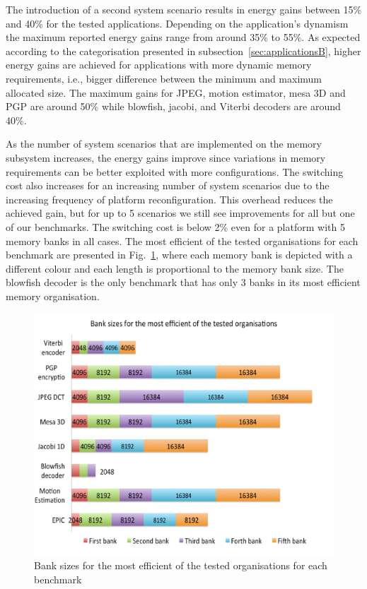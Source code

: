 The introduction of a second system scenario results in energy gains between 15\% and  40\%  for the tested applications. Depending on the application's dynamism the maximum reported energy gains range from around 35\% to 55\%. As expected according to the categorisation presented in subsection~\ref{sec:applicationsB}, higher energy gains are achieved for applications with more dynamic memory requirements, i.e., bigger difference between the minimum and maximum allocated size. The maximum gains for JPEG, motion estimator, mesa 3D and PGP are around 50\% while blowfish, jacobi, and Viterbi decoders are around 40\%. 

As the number of system scenarios that are implemented on the memory subsystem increases, the energy gains improve since variations in memory requirements can be better exploited with more configurations. The switching cost also increases for an increasing number of system scenarios due to the increasing frequency of platform reconfiguration. This overhead reduces the achieved gain, but for up to 5 scenarios we still see improvements for all but one of our benchmarks. The switching cost is below 2\% even for a platform with 5 memory banks in all cases. The most efficient of the tested organisations for each benchmark are presented in Fig.~\ref{fig:banks}, where each memory bank is depicted with a different colour and each length is proportional to the memory bank size. The blowfish decoder is the only benchmark that has only 3 banks in its most efficient memory organisation.

\begin{figure}[!t]
\centering
\includegraphics[width=\textwidth]{B/Images/banks2.pdf}
\caption{Bank sizes for the most efficient of the tested organisations for each benchmark}
\label{fig:banks}
\end{figure} 

